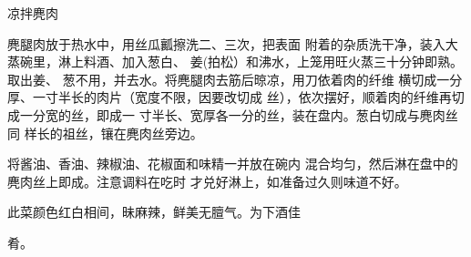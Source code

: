 \begin{recipe}{凉拌麂肉}

\ingredients


\cooking

\step 麂腿肉放于热水中，用丝瓜瓤擦洗二、三次，把表面 附着的杂质洗干净，装入大蒸碗里，淋上料酒、加入葱白、 姜(拍松）和沸水，上笼用旺火蒸三十分钟即熟。取出姜、 葱不用，并去水。将麂腿肉去筋后晾凉，用刀依着肉的纤维 横切成一分厚、一寸半长的肉片（宽度不限，因要改切成 丝），依次摆好，顺着肉的纤维再切成一分宽的丝，即成一 寸半长、宽厚各一分的丝，装在盘内。葱白切成与麂肉丝同 样长的祖丝，镶在麂肉丝旁边。

\step 将酱油、香油、辣椒油、花椒面和味精一并放在碗内 混合均匀，然后淋在盘中的麂肉丝上即成。注意调料在吃时 才兑好淋上，如准备过久则味道不好。

\notes

此菜颜色红白相间，昧麻辣，鲜美无膻气。为下酒佳

肴。

\end{recipe}

